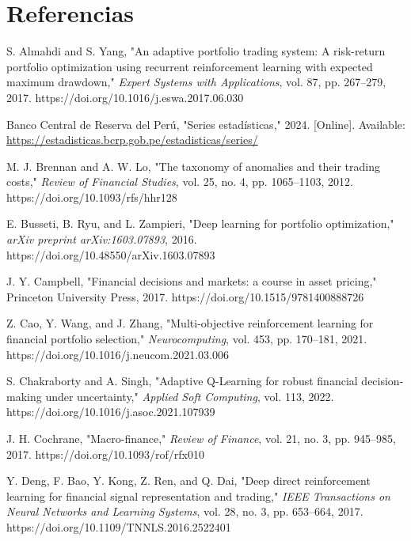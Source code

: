 \documentclass[conference]{IEEEtran}
\begin{document}
	\section{Referencias}
	\begin{thebibliography}{30}
		
		S. Almahdi and S. Yang, "An adaptive portfolio trading system: A risk-return portfolio optimization using recurrent reinforcement learning with expected maximum drawdown," \textit{Expert Systems with Applications}, vol. 87, pp. 267–279, 2017. https://doi.org/10.1016/j.eswa.2017.06.030
		
		Banco Central de Reserva del Perú, "Series estadísticas," 2024. [Online]. Available: \url{https://estadisticas.bcrp.gob.pe/estadisticas/series/}
		
		M. J. Brennan and A. W. Lo, "The taxonomy of anomalies and their trading costs," \textit{Review of Financial Studies}, vol. 25, no. 4, pp. 1065–1103, 2012. https://doi.org/10.1093/rfs/hhr128
		
		E. Busseti, B. Ryu, and L. Zampieri, "Deep learning for portfolio optimization," \textit{arXiv preprint arXiv:1603.07893}, 2016. https://doi.org/10.48550/arXiv.1603.07893
		
		J. Y. Campbell, "Financial decisions and markets: a course in asset pricing," Princeton University Press, 2017. https://doi.org/10.1515/9781400888726
		
		Z. Cao, Y. Wang, and J. Zhang, "Multi-objective reinforcement learning for financial portfolio selection," \textit{Neurocomputing}, vol. 453, pp. 170–181, 2021. https://doi.org/10.1016/j.neucom.2021.03.006
		
		S. Chakraborty and A. Singh, "Adaptive Q-Learning for robust financial decision-making under uncertainty," \textit{Applied Soft Computing}, vol. 113, 2022. https://doi.org/10.1016/j.asoc.2021.107939
		
		J. H. Cochrane, "Macro-finance," \textit{Review of Finance}, vol. 21, no. 3, pp. 945–985, 2017. https://doi.org/10.1093/rof/rfx010
		
		Y. Deng, F. Bao, Y. Kong, Z. Ren, and Q. Dai, "Deep direct reinforcement learning for financial signal representation and trading," \textit{IEEE Transactions on Neural Networks and Learning Systems}, vol. 28, no. 3, pp. 653–664, 2017. https://doi.org/10.1109/TNNLS.2016.2522401
		

\end{thebibliography}
\end{document}
